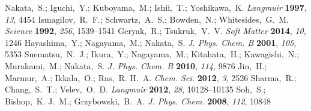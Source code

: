 \documentclass[journal=langd5, manuscript=article, layout=twocolumn]{achemso}
\begin{document}
\begin{mcitethebibliography}{27}
Nakata,~S.; Iguchi,~Y.; Kuboyama,~M.; Ishii,~T.; Yoshikawa,~K. \emph{Langmuir}
  \textbf{1997}, \emph{13}, 4454\relax
\mciteBstWouldAddEndPuncttrue
\mciteSetBstMidEndSepPunct{\mcitedefaultmidpunct}
{\mcitedefaultendpunct}{\mcitedefaultseppunct}\relax
\EndOfBibitem
{}
Ismagilov,~R.~F.; Schwartz,~A.~S.; Bowden,~N.; Whitesides,~G.~M. \emph{Science}
  \textbf{1992}, \emph{256}, 1539--1541\relax
\mciteBstWouldAddEndPuncttrue
\mciteSetBstMidEndSepPunct{\mcitedefaultmidpunct}
{\mcitedefaultendpunct}{\mcitedefaultseppunct}\relax
\EndOfBibitem
{}
Geryak,~R.; Tsukruk,~V.~V. \emph{Soft Matter} \textbf{2014}, \emph{10},
  1246\relax
\mciteBstWouldAddEndPuncttrue
\mciteSetBstMidEndSepPunct{\mcitedefaultmidpunct}
{\mcitedefaultendpunct}{\mcitedefaultseppunct}\relax
\EndOfBibitem
{}
Hayashima,~Y.; Nagayama,~M.; Nakata,~S. \emph{J. Phys. Chem. B} \textbf{2001},
  \emph{105}, 5353\relax
\mciteBstWouldAddEndPuncttrue
\mciteSetBstMidEndSepPunct{\mcitedefaultmidpunct}
{\mcitedefaultendpunct}{\mcitedefaultseppunct}\relax
\EndOfBibitem
{}
Suematsu,~N.~J.; Ikura,~Y.; Nagayama,~M.; Kitahata,~H.; Kawagishi,~N.;
  Murakami,~M.; Nakata,~S. \emph{J. Phys. Chem. B} \textbf{2010}, \emph{114},
  9876\relax
\mciteBstWouldAddEndPuncttrue
\mciteSetBstMidEndSepPunct{\mcitedefaultmidpunct}
{\mcitedefaultendpunct}{\mcitedefaultseppunct}\relax
\EndOfBibitem
{}
Jin,~H.; Marmur,~A.; Ikkala,~O.; Ras,~R. H.~A. \emph{Chem. Sci.} \textbf{2012},
  \emph{3}, 2526\relax
\mciteBstWouldAddEndPuncttrue
\mciteSetBstMidEndSepPunct{\mcitedefaultmidpunct}
{\mcitedefaultendpunct}{\mcitedefaultseppunct}\relax
\EndOfBibitem
{}
Sharma,~R.; Chang,~S.~T.; Velev,~O.~D. \emph{Langmuir} \textbf{2012},
  \emph{28}, 10128--10135\relax
\mciteBstWouldAddEndPuncttrue
\mciteSetBstMidEndSepPunct{\mcitedefaultmidpunct}
{\mcitedefaultendpunct}{\mcitedefaultseppunct}\relax
\EndOfBibitem
{}
Soh,~S.; Bishop,~K. J.~M.; Grzybowski,~B.~A. \emph{J. Phys. Chem.}
  \textbf{2008}, \emph{112}, 10848\relax
\mciteBstWouldAddEndPuncttrue
\mciteSetBstMidEndSepPunct{\mcitedefaultmidpunct}

\end{mcitethebibliography}
\end{document}
